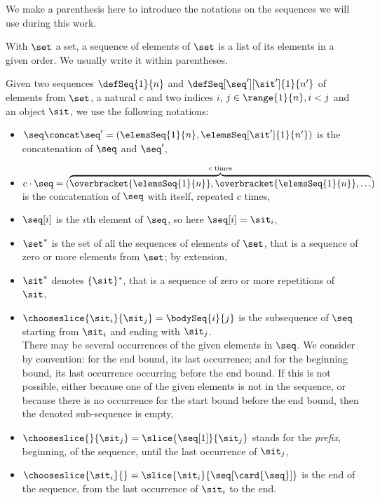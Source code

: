 We make a parenthesis here to introduce the notations on the sequences we will use during this work.

With $\set$ a set, a sequence of elements of $\set$ is a list of its elements in a given order.
We usually write it within parentheses.

Given two sequences $\defSeq{1}{n}$ and $\defSeq[\seq'][\sit']{1}{n'}$ of elements from $\set$, a natural $c$ and two indices $i$, $j \in \range{1}{n}, i < j$ and an object $\sit$, we use the following notations:
\begin{itemize}
  \item $\seq \concat \seq' = (\elemsSeq{1}{n}, \elemsSeq[\sit']{1}{n'})$ is the concatenation of $\seq$ and $\seq'$,
  \item $c \cdot \seq = (\overbrace{\overbracket{\elemsSeq{1}{n}}, \overbracket{\elemsSeq{1}{n}}, {\dots}}^{c \text{ times}})$ is the concatenation of $\seq$ with itself, repeated $c$ times,
  \item $\seq[i]$ is the $i$th element of $\seq$, so here $\seq[i] = \sit_i$, 
  \item $\set^*$ is the set of all the sequences of elements of $\set$, that is a sequence of zero or more elements from $\set$; by extension,
  \item $\sit^*$ denotes $\{\sit\}^*$, that is a sequence of zero or more repetitions of $\sit$,
  \item $\chooseslice{\sit_i}{\sit_j} = \bodySeq{i}{j}$ is the subsequence of $\seq$ starting from $\sit_i$ and ending with $\sit_j$.\\
    There may be several occurrences of the given elements in $\seq$.
    We consider by convention: for the end bound, its last occurrence; and for the beginning bound, its last occurrence occurring before the end bound.
    If this is not possible, either because one of the given elements is not in the sequence, or because there is no occurrence for the start bound before the end bound, then the denoted sub-sequence is empty,
  \item $\chooseslice{}{\sit_j} = \slice{\seq[1]}{\sit_j}$ stands for the \emph{prefix},  beginning, of the sequence, until the last occurrence of $\sit_j$,
  \item $\chooseslice{\sit_i}{} = \slice{\sit_i}{\seq[\card{\seq}]}$ is the end of the sequence, from the last occurrence of $\sit_i$ to the end.
\end{itemize}
